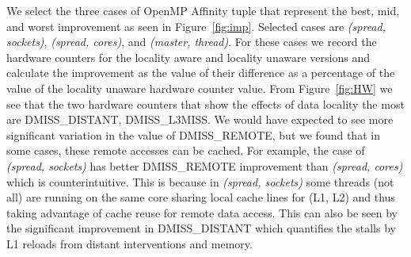 We select the three cases of OpenMP Affinity tuple that represent the best, mid, and worst improvement as seen in Figure~\ref{fig:imp}. 
Selected cases are \textit{(spread, sockets)},  \textit{(spread, cores)}, and \textit{(master, thread)}. 
For these cases we record the hardware counters for the locality aware and locality unaware versions and calculate the improvement as the value of their difference as a percentage of the value of the locality unaware hardware counter value. 
From Figure~\ref{fig:HW} we see that the two hardware counters that show the effects of data locality the most are DMISS\_DISTANT, DMISS\_L3MISS.
We would have expected to see more significant variation in the value of DMISS\_REMOTE, but we found that in some cases, these remote accesses can be cached.
For example, the case of \textit{(spread, sockets)} has better DMISS\_REMOTE improvement than  \textit{(spread, cores)} which is counterintuitive. 
This is because in \textit{(spread, sockets)} some threads (not all) are running on the same core sharing local cache lines for (L1, L2) and thus taking advantage of cache reuse for remote data access. 
This can also be seen by the significant improvement in DMISS\_DISTANT which quantifies the stalls by L1 reloads from distant interventions and memory. 


